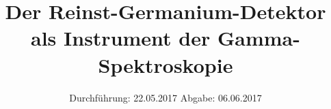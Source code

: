 

\subject{VERSUCH 18}
\title{Der Reinst-Germanium-Detektor als Instrument der Gamma-Spektroskopie}
\date{
  Durchführung: 22.05.2017
  \hspace{3em}
  Abgabe: 06.06.2017
}



\maketitle
\thispagestyle{empty}
\tableofcontents
\newpage


\clearpage
\newpage

\clearpage
\newpage

\clearpage
\newpage

\clearpage
\newpage

\clearpage
\newpage

\clearpage
\newpage

\printbibliography

\clearpage
\newpage





%
%
%     
%
